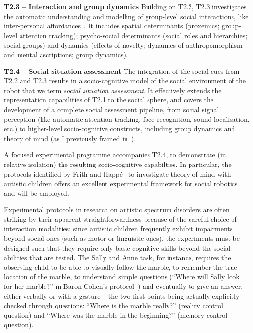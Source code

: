 \documentclass[11pt,a4paper]{report}
\begin{document}
\textbf{T2.3 -- Interaction and group dynamics} Building on T2.2, T2.3
investigates the automatic understanding and modelling of group-level social
interactions, like inter-personal affordances~\cite{pandey2013affordance}. It
includes spatial determinants (proxemics; group-level attention tracking);
psycho-social determinants (social roles and hierarchies; social groups) and
dynamics (effects of novelty; dynamics of anthropomorphism and mental
ascriptions; group dynamics). 


\textbf{T2.4 -- Social situation assessment} The integration of the social cues
from T2.2 and T2.3 results in a socio-cognitive model of the social environment
of the robot that we term \emph{social situation assessment}.  It effectively
extends the representation capabilities of T2.1 to the social sphere, and covers
the development of a complete social assessment pipeline, from social signal
perception (like automatic attention tracking, face recognition, sound
localisation, etc.) to higher-level socio-cognitive constructs, including group
dynamics and theory of mind (as I previously framed
in~\cite{lemaignan2015mutual, dillenbourg2016symmetry}).


A focused experimental
programme accompanies T2.4, to demonstrate (in relative isolation) the resulting
socio-cognitive capabilties. In particular, the protocols identified by Frith
and Happé~\cite{frith1994autism} to investigate theory of mind with autistic
children offers an excellent experimental framework for social
robotics~\cite{lemaignan2015mutual} and will be employed.

Experimental protocols in research on autistic spectrum disorders are often
striking by their apparent straightforwardness because of the careful choice of
interaction modalities: since autistic children frequently exhibit impairments
beyond social ones (such as motor or linguistic ones), the experiments must be
designed such that they require only basic cognitive skills beyond the social
abilities that are tested. The Sally and Anne task, for instance, requires the
observing child to be able to visually follow the marble, to remember the true
location of the marble, to understand simple questions (``Where will Sally look
for her marble?'' in Baron-Cohen's protocol~\cite{baron1985does}) and eventually
to give an answer, either verbally or with a gesture -- the two first points
being actually explicitly checked through questions: ``Where is the marble
really?'' (reality control question) and ``Where was the marble in the
beginning?'' (memory control question).
\end{document}

